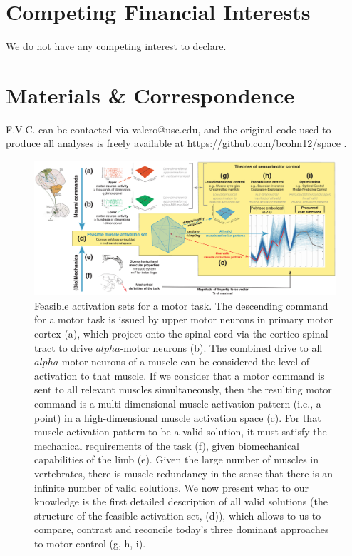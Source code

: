 \documentclass[10pt,letterpaper]{article}
\begin{document}
\section*{Competing Financial Interests}
We do not have any competing interest to declare.

\section*{Materials \& Correspondence}
F.V.C. can be contacted via valero@usc.edu, and the original code used to produce all analyses is freely available at https://github.com/bcohn12/space .





% 

\begin{figure}[htbp]
\centering
\includegraphics[width=1.0\textwidth]{numbered_figures/figure_1_overview.pdf}
\caption{Feasible activation sets for a motor task. The descending command for a motor task is issued by upper motor neurons in primary motor cortex (a), which project onto the spinal cord via the cortico-spinal tract to drive $alpha$-motor neurons (b). The combined drive to all $alpha$-motor neurons of a muscle can be considered the level of activation to that muscle.  If we consider that a motor command is sent to all relevant muscles simultaneously, then the resulting motor command is a  multi-dimensional muscle activation pattern (i.e., a point) in a high-dimensional muscle activation space \cite{Chao1978Graphical, spoor1983balancing, Kuo1993Human, Valero-Cuevas1998Large} (c). For that muscle activation pattern to be a valid solution, it must satisfy the mechanical requirements of the task (f), given biomechanical capabilities of the limb (e). Given the large number of muscles in vertebrates, there is muscle redundancy in the sense that there is an infinite number of valid solutions. We now present what to our knowledge is the first detailed description of all valid solutions (the structure of the feasible activation set, (d)), which allows to us to compare, contrast and reconcile today's three dominant approaches to motor control (g, h, i).}
\label{fig:overview}
\end{figure}
\end{document}
